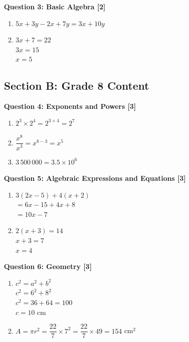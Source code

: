 \documentclass[12pt,a4paper]{article}
\begin{document}
\textbf{Question 3: Basic Algebra [2]}
\begin{enumerate}[label=(\alph*)]
    \item $5x + 3y - 2x + 7y = 3x + 10y$ \checkmark
    \vspace{0.3cm}
    
    \item $3x + 7 = 22$ \\
    $3x = 15$ \checkmark \\
    $x = 5$ \checkmark
\end{enumerate}

\subsection*{Section B: Grade 8 Content}

\textbf{Question 4: Exponents and Powers [3]}
\begin{enumerate}[label=(\alph*)]
    \item $2^3 \times 2^4 = 2^{3+4} = 2^7$ \checkmark
    \vspace{0.3cm}
    
    \item $\dfrac{x^8}{x^3} = x^{8-3} = x^5$ \checkmark
    \vspace{0.3cm}
    
    \item $3\,500\,000 = 3.5 \times 10^6$ \checkmark
\end{enumerate}

\textbf{Question 5: Algebraic Expressions and Equations [3]}
\begin{enumerate}[label=(\alph*)]
    \item $3(2x - 5) + 4(x + 2)$ \\
    $= 6x - 15 + 4x + 8$ \checkmark\checkmark \\
    $= 10x - 7$ \checkmark
    \vspace{0.3cm}
    
    \item $2(x + 3) = 14$ \\
    $x + 3 = 7$ \checkmark \\
    $x = 4$ \checkmark
\end{enumerate}

\textbf{Question 6: Geometry [3]}
\begin{enumerate}[label=(\alph*)]
    \item $c^2 = a^2 + b^2$ \\
    $c^2 = 6^2 + 8^2$ \checkmark \\
    $c^2 = 36 + 64 = 100$ \\
    $c = 10$ cm \checkmark\checkmark
    \vspace{0.3cm}
    
    \item $A = \pi r^2 = \dfrac{22}{7} \times 7^2 = \dfrac{22}{7} \times 49 = 154$ cm$^2$ \checkmark
\end{enumerate}
\end{document}
